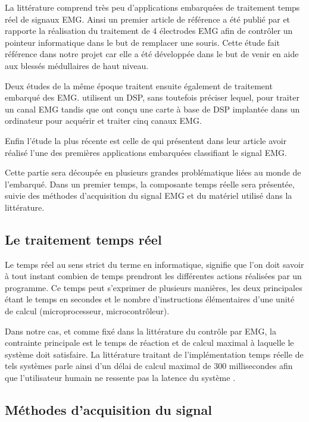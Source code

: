 \documentclass[letterpaper, twoside, 12pt, memoire, creativecommons, hyperref]{thETS}
\begin{document}
La littérature comprend très peu d'applications embarquées de traitement temps réel de signaux EMG. Ainsi un premier article de référence a été publié par \cite{Chang1996} et rapporte la réalisation du traitement de 4 électrodes EMG afin de contrôler un pointeur informatique dans le but de remplacer une souris. Cette étude fait référence dans notre projet car elle a été développée dans le but de venir en aide aux blessés médullaires de haut niveau. 

Deux études de la même époque traitent ensuite également de traitement embarqué des EMG. \cite{martinez1999} utilisent un DSP, sans toutefois préciser lequel, pour traiter un canal EMG tandis que \cite{Prasad1996} ont conçu une carte à base de DSP implantée dans un ordinateur pour acquérir et traiter cinq canaux EMG.

Enfin l'étude la plus récente est celle de \cite{Tenore2007} qui présentent dans leur article avoir réalisé l'une des premières applications embarquées classifiant le signal EMG.

Cette partie sera découpée en plusieurs grandes problématique liées au monde de l'embarqué. Dans un premier temps, la composante temps réelle sera présentée, suivie des méthodes d'acquisition du signal EMG et du matériel utilisé dans la littérature.

\subsection{Le traitement temps réel}

Le temps réel au sens strict du terme en informatique, signifie que l’on doit savoir à tout instant combien de temps prendront les différentes actions réalisées par un programme. Ce temps peut s'exprimer de plusieurs manières, les deux principales étant le temps en secondes et le nombre d'instructions élémentaires d'une unité de calcul (microprocesseur, microcontrôleur).

Dans notre cas, et comme fixé dans la littérature du contrôle par EMG, la contrainte principale est le temps de réaction et de calcul maximal à laquelle le système doit satisfaire. La littérature traitant de l’implémentation temps réelle de tels systèmes parle ainsi d’un délai de calcul maximal de 300 millisecondes afin que l’utilisateur humain ne ressente pas la latence du système \citep{Chu2007, Englehart2003}.

\subsection{Méthodes d'acquisition du signal}
\end{document}
